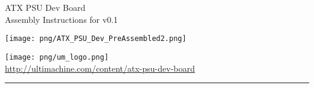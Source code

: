 \documentclass{article}
\newcommand{\HRule}[1]{\hfill \rule{0.2\linewidth}{#1}} %
\begin{document}
\begin{titlepage}

  {\Huge ATX PSU Dev Board }\\
  {\Large Assembly Instructions for v0.1} 
  \vspace*{\fill}	
  \begin{center}
  \texttt{[image: png/ATX\_PSU\_Dev\_PreAssembled2.png]}
  \end{center}
  \vspace*{\fill}

  \vfill
  {\centering \large 
  \hfill \texttt{[image: png/um\_logo.png]} \\
  \hfill \url{http://ultimachine.com/content/atx-psu-dev-board} \\

  \HRule{1pt}} %
\end{titlepage}

\clearpage %

\tableofcontents
\clearpage


\end{document}
